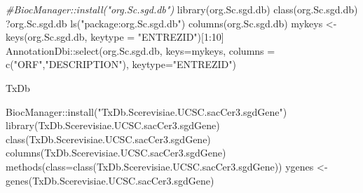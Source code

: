 \documentclass[
]{book}
\newenvironment{Shaded}{\begin{snugshade}}{\end{snugshade}}
\newcommand{\AttributeTok}[1]{\textcolor[rgb]{0.77,0.63,0.00}{#1}}
\newcommand{\CommentTok}[1]{\textcolor[rgb]{0.56,0.35,0.01}{\textit{#1}}}
\newcommand{\DecValTok}[1]{\textcolor[rgb]{0.00,0.00,0.81}{#1}}
\newcommand{\FunctionTok}[1]{\textcolor[rgb]{0.00,0.00,0.00}{#1}}
\newcommand{\NormalTok}[1]{#1}
\newcommand{\OtherTok}[1]{\textcolor[rgb]{0.56,0.35,0.01}{#1}}
\newcommand{\SpecialCharTok}[1]{\textcolor[rgb]{0.00,0.00,0.00}{#1}}
\newcommand{\StringTok}[1]{\textcolor[rgb]{0.31,0.60,0.02}{#1}}
\begin{document}
\begin{Shaded}
\begin{Highlighting}[]
\CommentTok{\#BiocManager::install("org.Sc.sgd.db")}
\FunctionTok{library}\NormalTok{(org.Sc.sgd.db)}
\FunctionTok{class}\NormalTok{(org.Sc.sgd.db)}
\NormalTok{?org.Sc.sgd.db}
\FunctionTok{ls}\NormalTok{(}\StringTok{"package:org.Sc.sgd.db"}\NormalTok{)}
\FunctionTok{columns}\NormalTok{(org.Sc.sgd.db)}
\NormalTok{mykeys }\OtherTok{\textless{}{-}} \FunctionTok{keys}\NormalTok{(org.Sc.sgd.db, }\AttributeTok{keytype =} \StringTok{"ENTREZID"}\NormalTok{)[}\DecValTok{1}\SpecialCharTok{:}\DecValTok{10}\NormalTok{]}
\NormalTok{AnnotationDbi}\SpecialCharTok{::}\FunctionTok{select}\NormalTok{(org.Sc.sgd.db, }
                      \AttributeTok{keys=}\NormalTok{mykeys, }
                      \AttributeTok{columns =} \FunctionTok{c}\NormalTok{(}\StringTok{"ORF"}\NormalTok{,}\StringTok{"DESCRIPTION"}\NormalTok{),}
                      \AttributeTok{keytype=}\StringTok{"ENTREZID"}\NormalTok{)}
\end{Highlighting}
\end{Shaded}

TxDb

\begin{Shaded}
\begin{Highlighting}[]

\NormalTok{BiocManager}\SpecialCharTok{::}\FunctionTok{install}\NormalTok{(}\StringTok{"TxDb.Scerevisiae.UCSC.sacCer3.sgdGene"}\NormalTok{)}
\FunctionTok{library}\NormalTok{(TxDb.Scerevisiae.UCSC.sacCer3.sgdGene)}
\FunctionTok{class}\NormalTok{(TxDb.Scerevisiae.UCSC.sacCer3.sgdGene)}
\FunctionTok{columns}\NormalTok{(TxDb.Scerevisiae.UCSC.sacCer3.sgdGene)}
\FunctionTok{methods}\NormalTok{(}\AttributeTok{class=}\FunctionTok{class}\NormalTok{(TxDb.Scerevisiae.UCSC.sacCer3.sgdGene))}
\NormalTok{ygenes }\OtherTok{\textless{}{-}} \FunctionTok{genes}\NormalTok{(TxDb.Scerevisiae.UCSC.sacCer3.sgdGene)}
\end{Highlighting}
\end{Shaded}

\begin{Shaded}
\end{Shaded}
\end{document}
